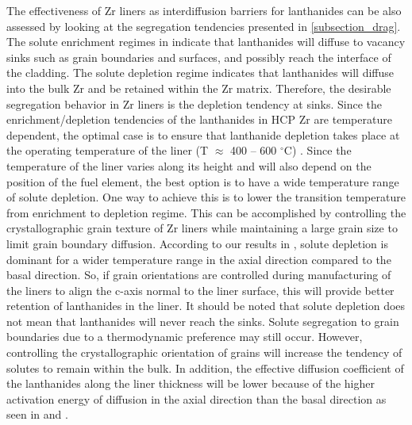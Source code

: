 \documentclass[preprint,12pt]{elsarticle}
\begin{document}
The effectiveness of Zr liners as interdiffusion barriers for lanthanides can be also assessed by looking at the segregation tendencies presented in \cref{subsection_drag}. The solute enrichment regimes in  indicate that lanthanides will diffuse to vacancy sinks such as grain boundaries and surfaces, and possibly reach the interface of the cladding. The solute depletion regime indicates that lanthanides will diffuse into the bulk Zr and be retained within the Zr matrix. Therefore, the desirable segregation behavior in Zr liners is the depletion tendency at sinks.
Since the enrichment/depletion tendencies of the lanthanides in HCP Zr are temperature dependent, the optimal case is to ensure that lanthanide depletion takes place at the operating temperature of the liner (T $\approx$ 400 -- 600 $^{\circ}$C) \cite{beausoleil_fast_2022}. Since the temperature of the liner varies along its height and will also depend on the position of the fuel element, the best option is to have a wide temperature range of solute depletion. One way to achieve this is to lower the transition temperature from enrichment to depletion regime. This can be accomplished by controlling the crystallographic grain texture of Zr liners while maintaining a large grain size to limit grain boundary diffusion. According to our results in , solute depletion is dominant for a wider temperature range in the axial direction compared to the basal direction. So, if grain orientations are controlled during manufacturing of the liners to align the c-axis normal to the liner surface, this will provide better retention of lanthanides in the liner. It should be noted that solute depletion does not mean that lanthanides will never reach the sinks. Solute segregation to grain boundaries due to a thermodynamic preference may still occur. However, controlling the crystallographic orientation of grains will increase the tendency of solutes to remain within the bulk. In addition, the effective diffusion coefficient of the lanthanides along the liner thickness will be lower because of the higher activation energy of diffusion in the axial direction than the basal direction as seen in  and .
\end{document}
